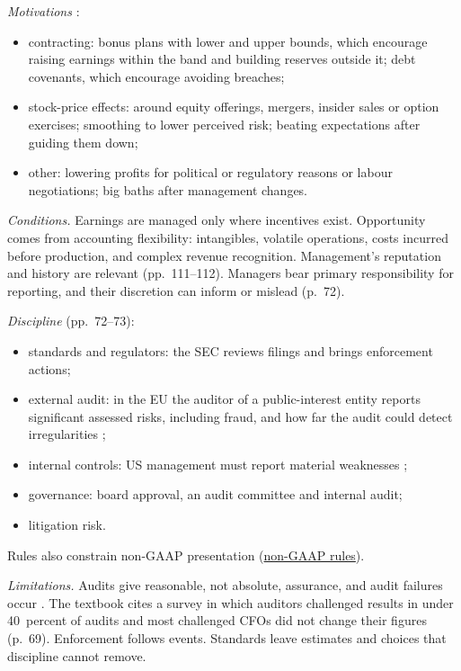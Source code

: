 \begin{qfdefinition}\label{def:reporting-incentives-discipline}
 \emph{Motivations} \citep[pp.~109--110]{financial-statement-analysis-2009}:
\begin{itemize}
\item contracting: bonus plans with lower and upper bounds, which encourage raising earnings within the band and building reserves outside it; debt covenants, which encourage avoiding breaches;
\item stock-price effects: around equity offerings, mergers, insider sales or option exercises; smoothing to lower perceived risk; beating expectations after guiding them down;
\item other: lowering profits for political or regulatory reasons or labour negotiations; big baths after management changes.
\end{itemize}

\emph{Conditions.} Earnings are managed only where incentives exist. Opportunity comes from accounting flexibility: intangibles, volatile operations, costs incurred before production, and complex revenue recognition. Management's reputation and history are relevant (pp.~111--112). Managers bear primary responsibility for reporting, and their discretion can inform or mislead (p.~72).

\emph{Discipline} (pp.~72--73):
\begin{itemize}
\item standards and regulators: the SEC reviews filings and brings enforcement actions;
\item external audit: in the EU the auditor of a public-interest entity reports significant assessed risks, including fraud, and how far the audit could detect irregularities \citep[Art.~10(2)]{eu-audit-regulation-2014};
\item internal controls: US management must report material weaknesses \citep[para.~(a)]{sec-sk-item-308};
\item governance: board approval, an audit committee and internal audit;
\item litigation risk.
\end{itemize}
Rules also constrain non-GAAP presentation (\hyperref[meth:earnings-management-presentation]{non-GAAP rules}).

\emph{Limitations.} Audits give reasonable, not absolute, assurance, and audit failures occur \citep[pp.~118--119]{financial-statement-analysis-2009}. The textbook cites a survey in which auditors challenged results in under 40~percent of audits and most challenged CFOs did not change their figures (p.~69). Enforcement follows events. Standards leave estimates and choices that discipline cannot remove.


\end{qfdefinition}

